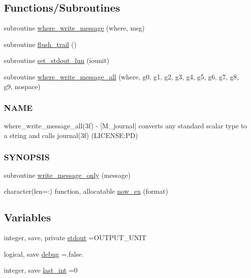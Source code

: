 \subsection*{Functions/\+Subroutines}
\begin{DoxyCompactItemize}
\item 
subroutine \mbox{\hyperlink{namespacem__journal_a21238c3fc7731703c75eb39233ab529e}{where\+\_\+write\+\_\+message}} (where, msg)
\item 
subroutine \mbox{\hyperlink{namespacem__journal_a24b891eded8ca585a6a72ab0eef7016c}{flush\+\_\+trail}} ()
\item 
subroutine \mbox{\hyperlink{namespacem__journal_a8388800481a5e7ca022b52cfc56b9daf}{set\+\_\+stdout\+\_\+lun}} (iounit)
\item 
subroutine \mbox{\hyperlink{namespacem__journal_a25d0f5da7f7e84e22ab0a583447412b1}{where\+\_\+write\+\_\+message\+\_\+all}} (where, g0, g1, g2, g3, g4, g5, g6, g7, g8, g9, nospace)
\begin{DoxyCompactList}\small\item\em \subsubsection*{N\+A\+ME}

where\+\_\+write\+\_\+message\+\_\+all(3f) -\/ \mbox{[}M\+\_\+journal\mbox{]} converts any standard scalar type to a string and calls journal(3f) (L\+I\+C\+E\+N\+SE\+:PD) \subsubsection*{S\+Y\+N\+O\+P\+S\+IS}\end{DoxyCompactList}\item 
subroutine \mbox{\hyperlink{namespacem__journal_aa86511a7c388f9286c282f6fa933ab58}{write\+\_\+message\+\_\+only}} (message)
\item 
character(len=\+:) function, allocatable \mbox{\hyperlink{namespacem__journal_a9c8074667748f2685122f2b3147e61d5}{now\+\_\+ex}} (format)
\end{DoxyCompactItemize}
\subsection*{Variables}
\begin{DoxyCompactItemize}
\item 
integer, save, private \mbox{\hyperlink{namespacem__journal_a664cf3fd85385b776d30ea589606ad1c}{stdout}} =O\+U\+T\+P\+U\+T\+\_\+\+U\+N\+IT
\item 
logical, save \mbox{\hyperlink{namespacem__journal_a6184fbcebdfa06f0a45ce4c699189b53}{debug}} =.false.
\item 
integer, save \mbox{\hyperlink{namespacem__journal_a47e8e34dc4072b04101027394d688519}{last\+\_\+int}} =0
\end{DoxyCompactItemize}


